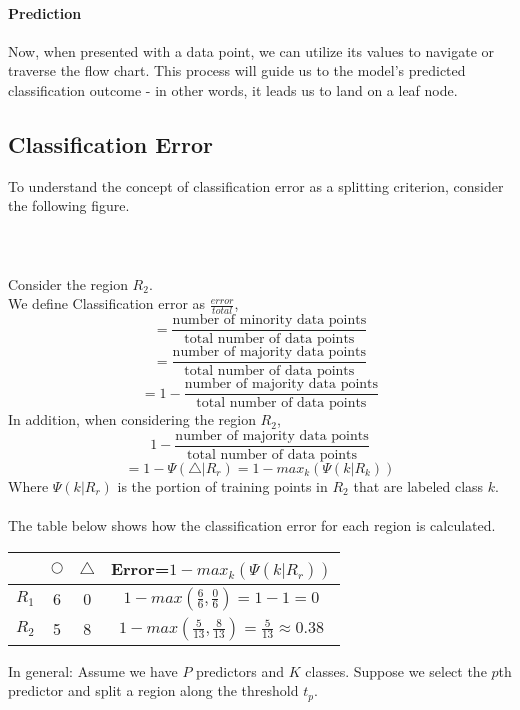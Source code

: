 \documentclass[10pt,a4paper]{report}
\begin{document}
\paragraph{Prediction}Now, when presented with a data point, we can utilize its values to navigate or traverse the flow chart. This process will guide us to the model's predicted classification outcome - in other words, it leads us to land on a leaf node.

\subsection{Classification Error}
To understand the concept of classification error as a splitting criterion, consider the following figure.\\\\
\\\\
Consider the region $R_2$.\\
We define Classification error as $\frac{error}{total}$,
$$=\frac{\textrm{number of minority data points}}{\textrm{total number of data points}}$$
$$=\frac{\textrm{number of majority data points}}{\textrm{total number of data points}}$$
$$=1-\frac{\textrm{number of majority data points}}{\textrm{total number of data points}}$$
In addition, when considering the region $R_2$,
$$1-\frac{\textrm{number of majority data points}}{\textrm{total number of data points}}$$
$$=1-\Psi(\triangle|R_r) = 1 - max_k(\Psi(k|R_k))$$
Where $\Psi(k|R_r)$ is the portion of training points in $R_2$ that are labeled class $k$.\\\\The table below shows how the classification error for each region is calculated.

\begin{center}
\begin{tabular}{ |c|c|c|c| } 
 \hline
  & $\bigcirc$ & $\triangle$ & Error=$1-max_k(\Psi(k|R_r))$\\\hline\hline
 $R_1$ & 6 & 0 & $1 - max(\frac{6}{6}, \frac{0}{6})= 1-1=0$\\\hline
 $R_2$ & 5 & 8 & $1 - max(\frac{5}{13}, \frac{8}{13}) = \frac{5}{13} \approx 0.38$\\\hline
\end{tabular}
\end{center}
In general: Assume we have $P$ predictors and $K$ classes. Suppose we select the $p$th predictor and split a region along the threshold $t_p$.
\end{document}
